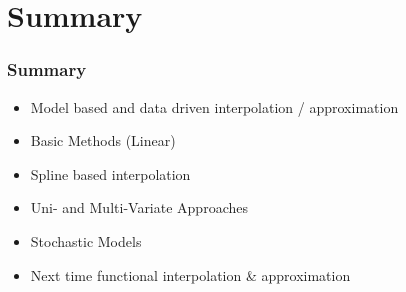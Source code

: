 \documentclass[10pt]{beamer}
\begin{document}
\section{Summary}

\begin{frame}
  \frametitle{Summary}
  \begin{itemize}
  \item Model based and data driven interpolation / approximation
  \item Basic Methods (Linear)
  \item Spline based interpolation
  \item Uni- and Multi-Variate Approaches
  \item Stochastic Models
  \item Next time functional interpolation \& approximation 
  \end{itemize}
\end{frame}
\end{document}
